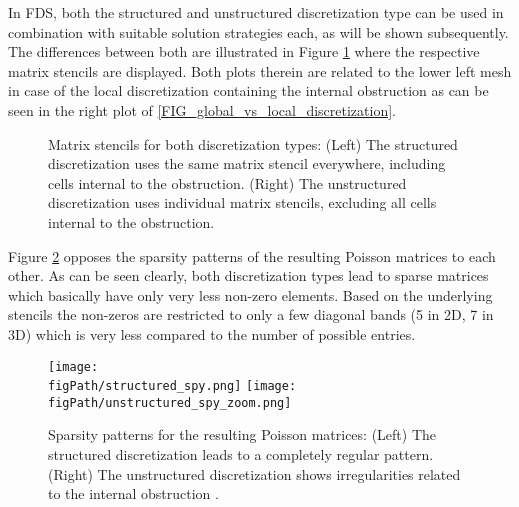 In FDS, both the structured and unstructured discretization type can be used in combination with suitable solution strategies each, as will be shown subsequently.
The differences between both are illustrated in Figure \ref{FIG_structured_vs_unstructured_discretization} 
where the respective matrix stencils are displayed. Both plots therein are related to
the lower left mesh in case of the local discretization containing the internal obstruction as can be seen in the right plot of \ref{FIG_global_vs_local_discretization}.
\begin{figure}[ht]
\begin{center}
\begin{minipage}[b]{0.475\textwidth}
\centering
\end{minipage}
\hspace{5mm}
\begin{minipage}[b]{0.475\textwidth}
\centering
\end{minipage}
\end{center}
\caption[Structured versus unstructured discretization]{Matrix stencils for both discretization types: (Left) The structured discretization uses the same matrix stencil everywhere, including cells internal to the obstruction. (Right) The unstructured discretization uses individual matrix stencils, excluding all cells internal to the obstruction.}
\label{FIG_structured_vs_unstructured_discretization}
\end{figure}

Figure \ref{FIG_structured_vs_unstructured_spy} opposes the sparsity patterns of the resulting Poisson matrices to each other.
As can be seen clearly, both discretization types lead to sparse matrices which basically have only very less non-zero elements. Based on the underlying stencils the non-zeros are restricted to only a few diagonal bands (5 in 2D, 7 in 3D)
which is very less compared to the number of possible entries.
\begin{figure}[h]
\begin{center}
\texttt{[image: \\figPath/structured\_spy.png]}\hspace{1.6cm}
\texttt{[image: \\figPath/unstructured\_spy\_zoom.png]}
\end{center}
\caption[Structured versus unstructured sparsity pattern]{Sparsity patterns for the resulting Poisson matrices: (Left) The structured discretization leads to a completely regular pattern. (Right) The unstructured discretization shows irregularities related to the internal obstruction .}
\label{FIG_structured_vs_unstructured_spy}
\end{figure}

